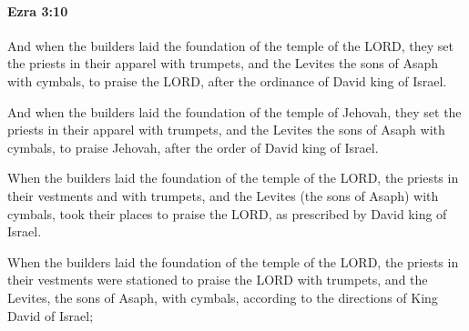 		\paragraph{Ezra 3:10} %
			\label{EZRA-3-10}

			And when the builders laid the foundation of the temple of the LORD, they set the priests in their apparel with trumpets, and the Levites the sons of Asaph with cymbals, to praise the LORD, after the ordinance of David king of Israel.

			\begin{versebox}
					\item[BHS] 
					\item[LXX] 
					\item[ASV] And when the builders laid the foundation of the temple of Jehovah, they set the priests in their apparel with trumpets, and the Levites the sons of Asaph with cymbals, to praise Jehovah, after the order of David king of Israel.
					\item[NIV] When the builders laid the foundation of the temple of the LORD, the priests in their vestments and with trumpets, and the Levites (the sons of Asaph) with cymbals, took their places to praise the LORD, as prescribed by David king of Israel.
					\item[NRSV] When the builders laid the foundation of the temple of the LORD, the priests in their vestments were stationed to praise the LORD with trumpets, and the Levites, the sons of Asaph, with cymbals, according to the directions of King David of Israel;
			\end{versebox}


